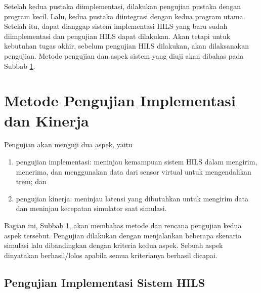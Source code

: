 Setelah kedua pustaka diimplementasi, dilakukan pengujian pustaka dengan program
kecil. Lalu, kedua pustaka diintegrasi dengan kedua program utama. Setelah itu,
dapat dianggap sistem implementasi HILS yang baru sudah diimplementasi dan
pengujian HILS dapat dilakukan. Akan tetapi untuk kebutuhan tugas akhir, sebelum
pengujian HILS dilakukan, akan dilaksanakan pengujian. Metode pengujian dan
aspek sistem yang diuji akan dibahas pada Subbab
\ref{chapter-4-testing-methodology}.

\section{Metode Pengujian Implementasi dan
  Kinerja}\label{chapter-4-testing-methodology}

Pengujian akan menguji dua aspek, yaitu
\begin{enumerate}
	\item pengujian implementasi: meninjau kemampuan sistem HILS dalam mengirim,
	      menerima, dan menggunakan data dari sensor virtual untuk
	      mengendalikan trem; dan
	\item pengujian kinerja: meninjau latensi yang dibutuhkan untuk mengirim
	      data dan meninjau kecepatan simulator saat simulasi.
\end{enumerate}
Bagian ini, Subbab \ref{chapter-4-testing-methodology}, akan membahas metode dan
rencana pengujian kedua aspek tersebut. Pengujian dilakukan dengan menjalankan
beberapa skenario simulasi lalu dibandingkan dengan kriteria kedua aspek. Sebuah
aspek dinyatakan berhasil/lolos apabila semua kriterianya berhasil dicapai.

\subsection{Pengujian Implementasi Sistem HILS}

